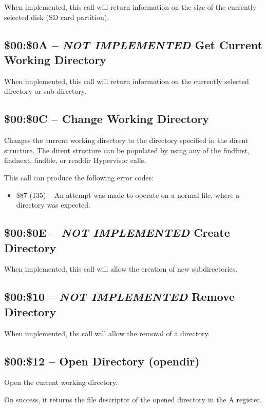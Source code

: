 When implemented, this call will return information on the size of the currently selected disk (SD card partition).

\subsection{\$00:\$0A -- {\em NOT IMPLEMENTED} Get Current Working Directory}

When implemented, this call will return information on the currently selected directory or sub-directory.

\subsection{\$00:\$0C -- Change Working Directory}

Changes the current working directory to the directory specified in the dirent structure. The dirent structure
can be populated by using any of the findfirst, findnext, findfile, or readdir Hypervisor calls.

This call can produce the following error codes:

\begin{itemize}
\item \$87 (135) -- An attempt was made to operate on a normal file, where a directory was expected.
\end{itemize}

\subsection{\$00:\$0E -- {\em NOT IMPLEMENTED} Create Directory}

When implemented, this call will allow the creation of new subdirectories.

\subsection{\$00:\$10 -- {\em NOT IMPLEMENTED} Remove Directory}

When implemented, ths call will allow the removal of a directory.

\subsection{\$00:\$12 -- Open Directory (opendir)}

Open the current working directory.

On success, it returns the file descriptor of the opened directory in the A register.

